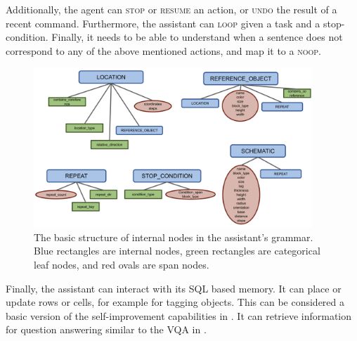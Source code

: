 \smallskip

 Additionally, the agent can \textsc{stop} or \textsc{resume} an action, or \textsc{undo} the result of a recent command.   Furthermore, the assistant can \textsc{loop} given a task and a stop-condition. Finally, it needs to be able to understand when a sentence does not correspond to any of the above mentioned actions, and map it to a \textsc{noop}.

\begin{figure}
    \centering
    \includegraphics[width=\linewidth, height=6cm ]{figures/NOT_AS.png}
    \caption{The basic structure of internal nodes in the assistant's grammar.   Blue rectangles are internal nodes,  green rectangles are categorical leaf nodes, and red ovals are span nodes.      \label{fig:NOT_AS}}
\end{figure}

\smallskip

  Finally, the assistant can interact with its SQL based memory.  It can place or update rows or cells, for example for tagging objects.  This can be considered a basic version of the self-improvement capabilities in \cite{kollar2013toward, thomason2015learning, wang2016learning, wang2017naturalizing}.    It can retrieve information for question answering similar to the VQA in \cite{yi2018neural}.


